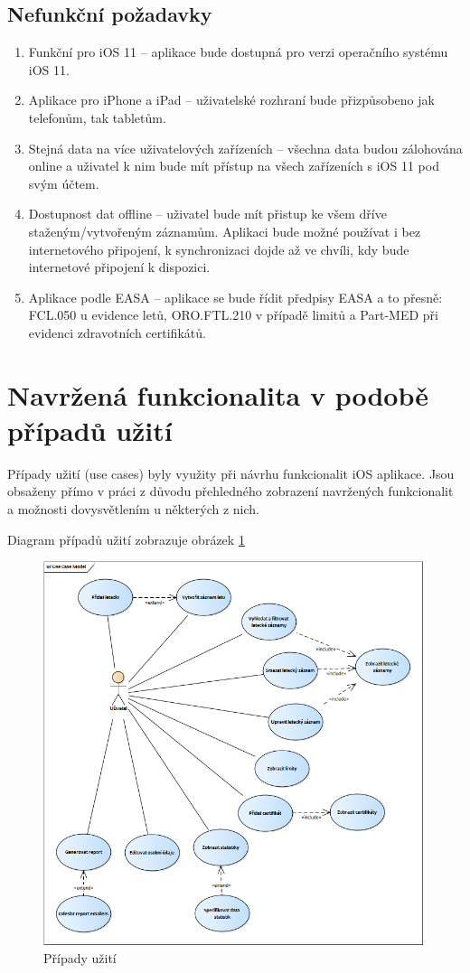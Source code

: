 \documentclass[thesis=M,czech]{FITthesis}[2012/06/26]
\begin{document}
\subsection{Nefunkční požadavky}
\begin{enumerate}
\item Funkční pro iOS 11 -- aplikace bude dostupná pro verzi operačního systému iOS 11.
\item Aplikace pro iPhone a iPad -- uživatelské rozhraní bude přizpůsobeno jak telefonům, tak tabletům.
\item Stejná data na více uživatelových zařízeních -- všechna data budou zálohována online a uživatel k nim bude mít přístup na všech zařízeních s iOS 11 pod svým účtem.
\item Dostupnost dat offline -- uživatel bude mít přistup ke všem dříve staženým/vytvořeným záznamům. Aplikaci bude možné používat i bez internetového připojení, k synchronizaci dojde až ve chvíli, kdy bude internetové připojení k dispozici.
\item Aplikace podle EASA -- aplikace se bude řídit předpisy EASA a to přesně: FCL.050 u evidence letů,  ORO.FTL.210 v případě limitů a Part-MED při evidenci zdravotních certifikátů.
\end{enumerate}

\section{Navržená funkcionalita v podobě případů užití}
Případy užití (use cases) byly využity při návrhu funkcionalit iOS aplikace. Jsou obsaženy přímo v práci z důvodu přehledného zobrazení navržených funkcionalit a možnosti dovysvětlením u některých z nich.

Diagram případů užití zobrazuje obrázek \ref{fig:UC}

\begin{figure}[]\centering
 \includegraphics[width=0.99\textwidth]{./pictures/UC/UC}
 \caption[Případy užití]{Případy užití}\label{fig:UC}
\end{figure}
\end{document}
